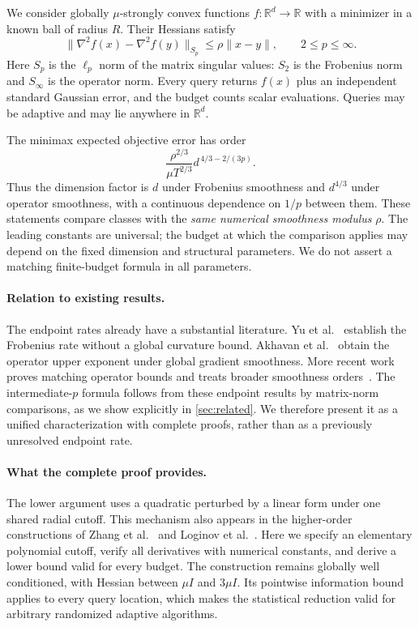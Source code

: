 \documentclass[11pt,a4paper]{article}
\newcommand{\R}{\mathbb R}
\theoremstyle{definition}
\theoremstyle{remark}
\begin{document}
We consider globally $\mu$-strongly convex functions $f:\R^d\to\R$ with a minimizer in a known ball of radius $R$. Their Hessians satisfy
\[
 \|\nabla^2f(x)-\nabla^2f(y)\|_{S_p}
 \le\rho\|x-y\|,
 \qquad 2\le p\le\infty.
\]
Here $S_p$ is the $\ell_p$ norm of the matrix singular values: $S_2$ is the Frobenius norm and $S_\infty$ is the operator norm. Every query returns $f(x)$ plus an independent standard Gaussian error, and the budget counts scalar evaluations. Queries may be adaptive and may lie anywhere in $\R^d$.

The minimax expected objective error has order
\begin{equation}\label{eq:intro-rate}
 \frac{\rho^{2/3}}{\mu T^{2/3}}
 d^{\,4/3-2/(3p)}.
\end{equation}
Thus the dimension factor is $d$ under Frobenius smoothness and $d^{4/3}$ under operator smoothness, with a continuous dependence on $1/p$ between them. These statements compare classes with the \emph{same numerical smoothness modulus} $\rho$. The leading constants are universal; the budget at which the comparison applies may depend on the fixed dimension and structural parameters. We do not assert a matching finite-budget formula in all parameters.

\paragraph{Relation to existing results.}
The endpoint rates already have a substantial literature. Yu et al.~\cite{Yu2024} establish the Frobenius rate without a global curvature bound. Akhavan et al.~\cite{Akhavan2024} obtain the operator upper exponent under global gradient smoothness. More recent work proves matching operator bounds and treats broader smoothness orders~\cite{Zhang2026,Loginov2026}. The intermediate-$p$ formula follows from these endpoint results by matrix-norm comparisons, as we show explicitly in \cref{sec:related}. We therefore present it as a unified characterization with complete proofs, rather than as a previously unresolved endpoint rate.

\paragraph{What the complete proof provides.}
The lower argument uses a quadratic perturbed by a linear form under one shared radial cutoff. This mechanism also appears in the higher-order constructions of Zhang et al.~\cite{Zhang2026} and Loginov et al.~\cite{Loginov2026}. Here we specify an elementary polynomial cutoff, verify all derivatives with numerical constants, and derive a lower bound valid for every budget. The construction remains globally well conditioned, with Hessian between $\mu I$ and $3\mu I$. Its pointwise information bound applies to every query location, which makes the statistical reduction valid for arbitrary randomized adaptive algorithms.
\end{document}
